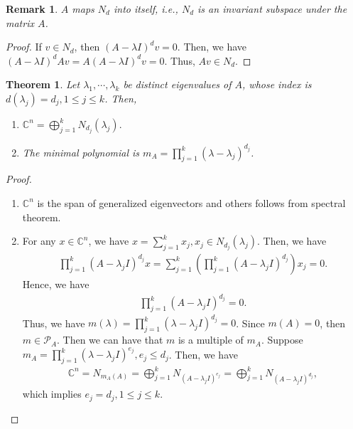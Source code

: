 \documentclass[11pt]{book}
\newtheorem{theorem}{Theorem}[chapter]
\newtheorem{remark}{Remark}[chapter]
\theoremstyle{definition}
\numberwithin{equation}{chapter}
\begin{document}
\medskip

\begin{remark}
$A$ maps $N_d$ into itself, i.e., $N_d$ is an invariant subspace under the matrix $A$.
\end{remark}
\begin{proof}
If $v\in N_d$, then $(A - \lambda I)^d v = 0$. Then, we have $(A - \lambda I)^d Av = A(A - \lambda I)^d v = 0$. Thus, $Av \in N_d$.
\end{proof}

\medskip

\begin{theorem}
Let $\lambda_1,\cdots,\lambda_k$ be distinct eigenvalues of $A$, whose index is $d\left(\lambda_j\right) = d_j, 1\leq j \leq k$. Then,
\begin{enumerate}[label=(\alph*)]
    \item $\mathbb{C}^n = \bigoplus^k_{j=1}N_{d_j}(\lambda_j).$
    \item The minimal polynomial is $m_A = \prod^k_{j=1}\left(\lambda - \lambda_j \right)^{d_j}$.
\end{enumerate}
\end{theorem}
\begin{proof}
~\begin{enumerate}[label=(\alph*)]
    \item $\mathbb{C}^n$ is the span of generalized eigenvectors and others follows from spectral theorem.
    \item For any $x\in\mathbb{C}^n$, we have $x = \sum^k_{j=1}x_j, x_j\in N_{d_j}(\lambda_j)$. Then, we have 
    \begin{align*}
        \prod^k_{j=1} \left(A - \lambda_j I\right)^{d_j}x = \sum^k_{j=1}\left(\prod^k_{j=1} \left(A - \lambda_j I\right)^{d_j} \right)x_j = 0.
    \end{align*}
    Hence, we have 
    \begin{align*}
        \prod^k_{j=1} \left(A - \lambda_j I\right)^{d_j} = 0.
    \end{align*}
    Thus, we have $m(\lambda) = \prod^k_{j=1} \left(\lambda - \lambda_j I\right)^{d_j} = 0$. Since $m(A) = 0$, then $m\in \mathcal{P}_A$. Then we can have that $m$ is a multiple of $m_A$. Suppose $m_A = \prod^k_{j=1} \left(\lambda - \lambda_j I\right)^{e_j}, e_j\leq d_j$. Then, we have 
    \begin{align*}
        \mathbb{C}^n = N_{m_A(A)} = \bigoplus^k_{j=1}N_{(A-\lambda_j I)^{e_j}} = \bigoplus^k_{j=1}N_{(A-\lambda_j I)^{d_j}},
    \end{align*}
    which implies $e_j = d_j, 1\leq j \leq k$.
\end{enumerate}
\end{proof}
\end{document}
